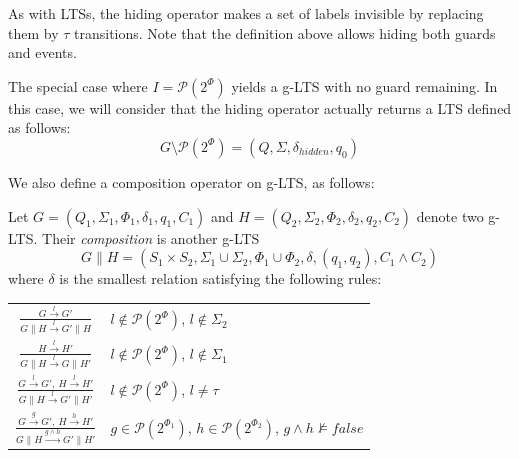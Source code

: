 As with LTSs, the hiding operator makes a set of labels invisible by replacing them by $\tau$ transitions. Note that the definition above allows hiding both guards and events. 

The special case where $I = \mathcal{P}(2^\Phi)$ yields a g-LTS with no guard remaining. In this case, we will consider that the hiding operator actually returns a LTS defined as follows:
\begin{equation*}
G \setminus \mathcal{P}(2^\Phi) = (Q,\Sigma,\delta_{hidden},q_0)
\end{equation*}

We also define a composition operator on g-LTS, as follows:

\begin{definition}
Let $G = (Q_1,\Sigma_1,\Phi_1,\delta_1,q_{1},C_{1})$ and $H = (Q_2,\Sigma_2,\Phi_2,\delta_2,q_{2},C_{2})$ denote two g-LTS. Their \emph{composition} is another g-LTS 
\begin{equation*}
G \parallel H = (S_1 \times S_2,\Sigma_1\cup\Sigma_2,\Phi_1\cup\Phi_2,\delta,(q_1,q_2),C_1 \wedge C_2)
\end{equation*}
\noindent where $\delta$ is the smallest relation satisfying the following rules:

\centering
\begin{tabular}{cl}
$\frac{\displaystyle G \stackrel{l}{\longrightarrow} G'}{\displaystyle G \parallel H \stackrel{l}{\longrightarrow} G' \parallel H}$ & $l \notin \mathcal{P}(2^\Phi)$, $l \notin \Sigma_2$ \\[20pt]

$\frac{\displaystyle H \stackrel{l}{\longrightarrow} H'}{\displaystyle G \parallel H \stackrel{l}{\longrightarrow} G \parallel H'}$ & $l \notin \mathcal{P}(2^\Phi)$, $l \notin \Sigma_1$ \\[20pt]

$\frac{\displaystyle G \stackrel{l}{\longrightarrow} G',~H \stackrel{l}{\longrightarrow} H'}{\displaystyle G \parallel H \stackrel{l}{\longrightarrow} G' \parallel H'}$ & $l \notin \mathcal{P}(2^\Phi)$, $l \neq \tau$ \\[20pt]

$\frac{\displaystyle G \stackrel{g}{\longrightarrow} G',~H \stackrel{h}{\longrightarrow} H'}{\displaystyle G \parallel H \stackrel{g \wedge h}{\longrightarrow} G' \parallel H'}$ & $g \in \mathcal{P}(2^{\Phi_1})$, $h \in \mathcal{P}(2^{\Phi_2})$, $g \wedge h \nvDash false$ 
\end{tabular}
\end{definition}

